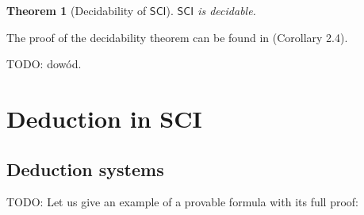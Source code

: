 \documentclass{article}
\newtheorem{theorem}{Theorem}
\theoremstyle{definition}
\newtheorem{definition}{Definition}[section]
\newcommand*{\Ts}{T^*}
\newcommand*{\id}{\equiv}
\newcommand{\SCI}{$\mathsf{SCI}$\xspace}
\begin{document}
\begin{theorem}[Decidability of \SCI]
    \SCI is decidable.
\end{theorem}
The proof of the decidability theorem can be found in \cite{suszko_bloom}
(Corollary 2.4).

TODO: dowód.

\section{Deduction in SCI}

\subsection{Deduction systems}

TODO: Let us give an example of a provable formula with its full proof:




\end{document}
